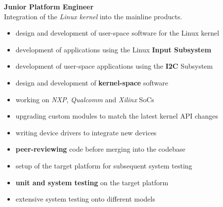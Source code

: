 \documentclass[letterpaper]{twentysecondcv} %
\begin{document}
\begin{twenty}
{            \textbf{Junior Platform Engineer}\\
            Integration of the \textit{Linux kernel} into the mainline products.
            \begin{itemize}
                \item design and development of user-space software for the Linux kernel
                \item development of applications using the Linux \textbf{Input Subsystem}
                \item development of user-space applications using the \textbf{I2C} Subsystem
                \item design and development of \textbf{kernel-space} software
                \item working on \textit{NXP}, \textit{Qualcomm} and \textit{Xilinx} SoCs
                \item upgrading custom modules to match the latest kernel API changes
                \item writing device drivers to integrate new devices
                \item \textbf{peer-reviewing} code before merging into the codebase
                \item setup of the target platform for subsequent system testing
                \item \textbf{unit and system testing} on the target platform
                \item extensive system testing onto different models
            \end{itemize}

}
\end{twenty}
\end{document}
